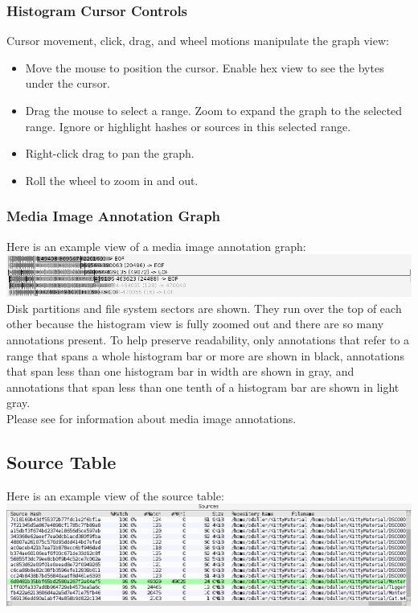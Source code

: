 \documentclass[11pt,fleqn]{article} %
\begin{document}
\subsubsection{Histogram Cursor Controls}
Cursor movement, click, drag, and wheel motions manipulate the graph view:
\begin{itemize}
\item Move the mouse to position the cursor. Enable hex view to see the bytes under the cursor.
\item Drag the mouse to select a range. Zoom to expand the graph to the selected range. Ignore or highlight hashes or sources in this selected range.
\item Right-click drag to pan the graph.
\item Roll the wheel to zoom in and out.
\end{itemize}

\subsubsection{Media Image Annotation Graph}
Here is an example view of a media image annotation graph:\\
\includegraphics[scale=.4]{screenshots/annotations}\\
Disk partitions and file system sectors are shown. They run over the top of each other because the histogram view is fully zoomed out and there are so many annotations present. To help preserve readability, only annotations that refer to a range that spans a whole histogram bar or more are shown in black, annotations that span less than one histogram bar in width are shown in gray, and annotations that span less than one tenth of a histogram bar are shown in light gray.\\

Please see \textbf{} for information about media image annotations.

\subsection{Source Table}
Here is an example view of the source table:\\
\includegraphics[scale=.4]{screenshots/source_table}\\
\end{document}
